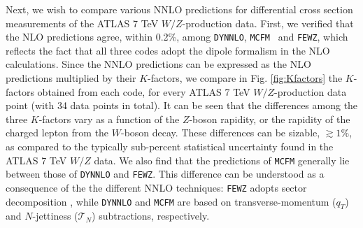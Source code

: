 Next, we wish to compare various NNLO predictions for differential cross section measurements of the ATLAS 7 TeV $W/Z$-production data.  
First, we verified that the NLO predictions agree, within 0.2\%, among  \texttt{DYNNLO},  \texttt{MCFM}~\cite{Boughezal:2016wmq,MCFM8} 
and \texttt{FEWZ}, which reflects the fact that all three codes adopt the dipole formalism \cite{Catani:1996jh,Catani:1996vz} in the NLO calculations. 
Since the NNLO predictions can be expressed as the NLO predictions multiplied by their $K$-factors, we compare in Fig. \ref{fig:Kfactors} the $K$-factors obtained from each code,
for every ATLAS 7 TeV $W/Z$-production data point (with 34 data points in total).
It can be seen that the differences among the three $K$-factors vary as a function of the $Z$-boson rapidity, or the rapidity of the charged lepton from the $W$-boson decay. 
These differences can be sizable, $\gtrsim\!1\%$, as compared to the typically sub-percent statistical uncertainty found in the ATLAS 7 TeV $W/Z$ data.  
We also find that the predictions of \texttt{MCFM} generally lie between those of \texttt{DYNNLO} and \texttt{FEWZ}. This difference can be understood as a consequence
of the the different NNLO techniques: \texttt{FEWZ} adopts sector decomposition \cite{Binoth:2000ps,Anastasiou:2003gr,Anastasiou:2005qj}, while \texttt{DYNNLO} and \texttt{MCFM}
are based on transverse-momentum ($q_T$) \cite{Catani:2007vq,Catani:2009sm} and $N$-jettiness ($\mathcal{T}_N$) \cite{Boughezal:2016wmq} subtractions, respectively. 

